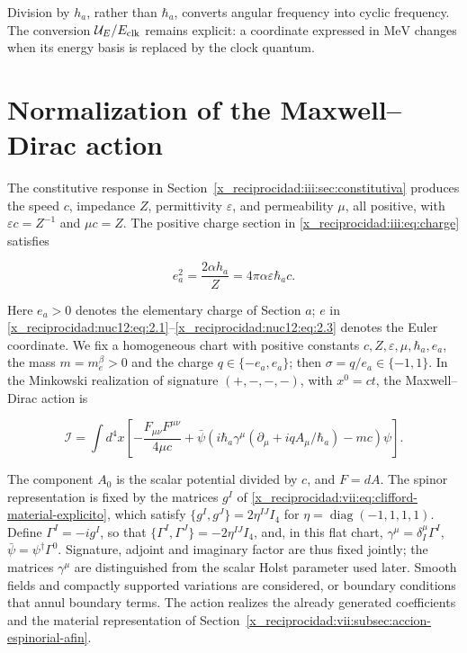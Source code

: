 Division by \(h_a\), rather than \(\hbar_a\), converts angular frequency into cyclic frequency. The conversion \(\mathcal U_E/E_{\rm clk}\) remains explicit: a coordinate expressed in \(\mathrm{MeV}\) changes when its energy basis is replaced by the clock quantum.

\section{Normalization of the Maxwell--Dirac action}

The constitutive response in Section~\ref{x_reciprocidad:iii:sec:constitutiva} produces the speed \(c\), impedance \(Z\), permittivity \(\varepsilon\), and permeability \(\mu\), all positive, with \(\varepsilon c=Z^{-1}\) and \(\mu c=Z\). The positive charge section in \eqref{x_reciprocidad:iii:eq:charge} satisfies



\begin{equation}
e_a^2=\frac{2\alpha h_a}{Z}
=4\pi\alpha\varepsilon\hbar_a c .
\label{x_reciprocidad:nuc12:eq:3.1}
\end{equation}



Here \(e_a>0\) denotes the elementary charge of Section \(a\); \(e\) in \eqref{x_reciprocidad:nuc12:eq:2.1}--\eqref{x_reciprocidad:nuc12:eq:2.3} denotes the Euler coordinate. We fix a homogeneous chart with positive constants \(c,Z,\varepsilon,\mu,\hbar_a,e_a\), the mass \(m=m_e^\beta>0\) and the charge \(q\in\{-e_a,e_a\}\); then \(\sigma=q/e_a\in\{-1,1\}\). In the Minkowski realization of signature \((+,-,-,-)\), with \(x^0=ct\), the Maxwell--Dirac action is



\begin{equation}
\mathcal I=\int d^4x\left[
-\frac{F_{\mu\nu}F^{\mu\nu}}{4\mu c}
+\bar\psi\left(i\hbar_a\gamma^\mu
(\partial_\mu+iqA_\mu/\hbar_a)-mc\right)\psi
\right].
\label{x_reciprocidad:nuc12:eq:3.2}
\end{equation}



The component \(A_0\) is the scalar potential divided by \(c\), and \(F=dA\). The spinor representation is fixed by the matrices \(g^I\) of \eqref{x_reciprocidad:vii:eq:clifford-material-explicito}, which satisfy \(\{g^I,g^J\}=2\eta^{IJ}I_4\) for \(\eta=\operatorname{diag}(-1,1,1,1)\). Define \(\Gamma^I=-ig^I\), so that \(\{\Gamma^I,\Gamma^J\}=-2\eta^{IJ}I_4\), and, in this flat chart, \(\gamma^\mu=\delta^\mu_I\Gamma^I\), \(\bar\psi=\psi^\dagger\Gamma^0\). Signature, adjoint and imaginary factor are thus fixed jointly; the matrices \(\gamma^\mu\) are distinguished from the scalar Holst parameter used later. Smooth fields and compactly supported variations are considered, or boundary conditions that annul boundary terms. The action realizes the already generated coefficients and the material representation of Section~\ref{x_reciprocidad:vii:subsec:accion-espinorial-afin}.

